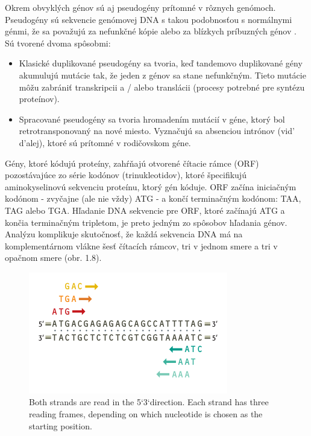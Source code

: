 Okrem obvyklých génov sú aj pseudogény prítomné v rôznych genómoch.
Pseudogény sú sekvencie genómovej DNA s takou podobnosťou s normálnymi génmi, že sa považujú za nefunkčné kópie alebo za blízkych príbuzných génov \cite{PrinciplesOfGeneManipulation}. 
Sú tvorené dvoma spôsobmi:
\begin{itemize}
	\item Klasické duplikované pseudogény sa tvoria, keď tandemovo duplikované gény akumulujú mutácie tak, že jeden z génov sa stane nefunkčným.
	Tieto mutácie môžu zabrániť transkripcii a / alebo translácii (procesy potrebné pre syntézu proteínov).
	\item Spracované pseudogény sa tvoria hromadením mutácií v géne, ktorý bol retrotransponovaný na nové miesto.
	Vyznačujú sa absenciou intrónov (vid' d'alej), ktoré sú prítomné v rodičovskom géne.
\end{itemize} 

Gény, ktoré kódujú proteíny, zahŕňajú otvorené čítacie rámce (ORF) pozostávajúce zo série kodónov (trinukleotidov), ktoré špecifikujú aminokyselinovú sekvenciu proteínu, ktorý gén kóduje.
ORF začína iniciačným kodónom - zvyčajne (ale nie vždy) ATG - a končí terminačným kodónom: TAA, TAG alebo TGA.
Hľadanie DNA sekvencie pre ORF, ktoré začínajú ATG a končia terminačným tripletom, je preto jedným zo spôsobov hľadania génov.
Analýzu komplikuje skutočnosť, že každá sekvencia DNA má na komplementárnom vlákne šesť čítacích rámcov, tri v jednom smere a tri v opačnom smere (obr. 1.8).

\begin{figure}[!ht]
	\centering
	\includegraphics[width=.6\textwidth]{figures/ORF2.png}
	\caption{Both
	strands are read in the 5`3`direction. Each
	strand has three reading frames, depending
	on which nucleotide is chosen as the
	starting position.\label{o:latex_friendly_zone}}
\end{figure}

